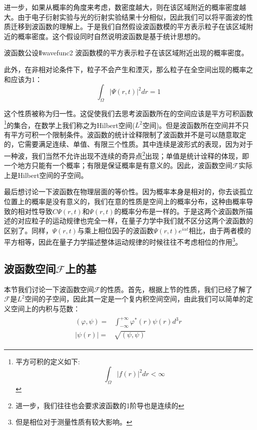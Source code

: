     进一步，如果从概率的角度来考虑，数密度越大，则在该区域附近的概率密度越大。由于电子衍射实验与光的衍射实验结果十分相似，因此我们可以将平面波的性质迁移到波函数的理解上。于是我们自然假设波函数模的平方表示粒子在该区域附近的概率密度。这个假设同时自然说明波函数是基于统计思想的。
    \begin{definition}{波函数公设Ⅱ}{wavefunc2}
        波函数模的平方表示粒子在该区域附近出现的概率密度。
    \end{definition}
 
 此外，在非相对论条件下，粒子不会产生和湮灭，那么粒子在全空间出现的概率之和应该为1：
 \begin{equation}
      \int_{\Omega}|\Psi(r,t)|^2dr=1
 \end{equation}

这个性质被称为归一性。这促使我们去思考波函数所在的空间应该是平方可积函数\footnote{平方可积的定义如下:
\begin{equation*}
    \int_{\Omega} |f(r)|^2dr<\infty
\end{equation*}
}的集合，在数学上我们称之为Hilbert空间($L^2$空间)。但是波函数所在空间并不只有平方可积一个限制条件。波函数的统计诠释限制了波函数并不是可以随意取定的，它需要满足连续、单值、有限三个性质。其中连续是波形式的表现，因为对于一种波，我们当然不允许出现不连续的奇异点\footnote{进一步，我们往往也会要求波函数的1阶导也是连续的}出现；单值是统计诠释的体现，即一个地方只能有一个概率；有限是保证概率是有意义的。因此，波函数空间$\mathscr{F}$实际上是Hilbert空间的子空间。

最后想讨论一下波函数在物理层面的等价性。因为概率本身是相对的，你去谈孤立位置上的概率是没有意义的，我们在意的性质是空间上的概率分布，这种由概率导致的相对性导致$C\Psi(r,t)$和$\Psi(r,t)$的概率分布是一样的。于是这两个波函数所描述的对应粒子的运动规律也完全一样，在量子力学中我们就不区分这两个波函数的区别了。同样，$\Psi(r,t)$与乘上相位因子的波函数$\Psi(r,t)e^{i\alpha t}$相比，由于两者模的平方相等，因此在量子力学描述整体运动规律的时候往往不考虑相位的作用\footnote{但是相位对于测量性质有较大影响。}。
    \subsection{波函数空间$\mathscr{F}$上的基}
    本节我们讨论一下波函数空间$\mathscr{F}$的性质。首先，根据上节的性质，我们已经了解了$\mathscr{F}$是$L^2$空间的子空间，因此其一定是一个复内积空间空间，由此我们可以简单的定义空间上的内积与范数：
    \begin{align}
        \begin{split}
            (\varphi,\psi)=&\int_{-\infty}^{+\infty}\varphi^{*}(r)\psi(r)d^3r\\
            |\psi(r)|=&\sqrt{(\psi,\psi)}
        \end{split}
    \end{align}
    
